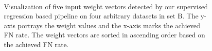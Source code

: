 \documentclass[a4paper,fleqn, review]{cas-dc}
\begin{document}

\begin{figure}[!htbp]\begin{adjustwidth}{-0.6cm}{}
		\centering
		\\
	\end{adjustwidth}
	\caption{Visualization of five input weight vectors detected by our supervised regression based pipeline on four arbitrary datasets in set B. The y-axis portrays the weight values and the x-axis marks the achieved FN rate. The weight vectors are sorted in ascending order based on the achieved FN rate. }
	\label{fig:some-good-weight-ml}
\end{figure}
\end{document}
